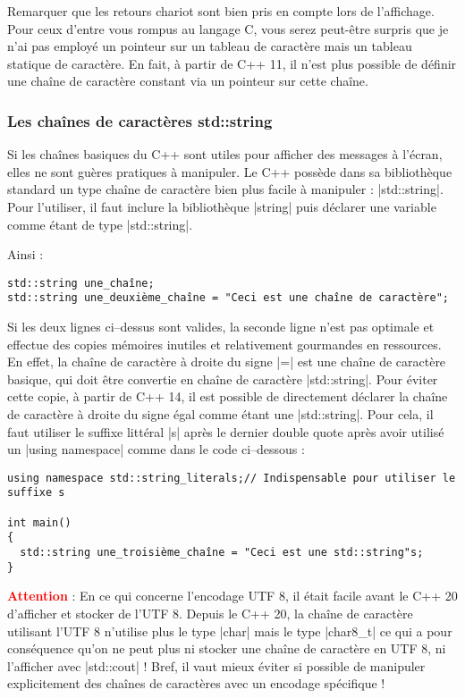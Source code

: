 Remarquer que les retours chariot sont bien pris en compte lors de l'affichage. Pour ceux d'entre vous rompus au langage C, vous serez peut-être surpris que je n'ai pas employé un pointeur sur un tableau de caractère mais un tableau statique
de caractère. En fait, à partir de C++ 11, il n'est plus possible de définir une chaîne de caractère constant via un pointeur sur cette chaîne.

\subsubsection{Les chaînes de caractères std::string}

Si les chaînes basiques du C++ sont utiles pour afficher des messages à l'écran, elles ne sont guères pratiques à manipuler. Le C++ possède dans sa bibliothèque standard un type chaîne de caractère bien plus facile à manipuler : |std::string|. Pour l'utiliser, il faut inclure la bibliothèque |string| puis déclarer une variable comme étant de type |std::string|.

Ainsi :
\begin{lstlisting}[caption=Déclaration d'une std::string]
std::string une_chaîne;
std::string une_deuxième_chaîne = "Ceci est une chaîne de caractère";
\end{lstlisting}

Si les deux lignes ci--dessus sont valides, la seconde ligne n'est pas optimale et effectue des copies mémoires inutiles et relativement gourmandes en ressources. En effet, la chaîne de caractère à droite du signe |=| est une chaîne de caractère basique, qui doit être convertie en chaîne de caractère |std::string|. 
Pour éviter cette copie, à partir de C++ 14, il est possible
de directement déclarer la chaîne de caractère à droite du signe égal comme étant une |std::string|. Pour cela, il faut utiliser le suffixe littéral |s| après le dernier double quote après avoir utilisé un |using namespace| comme dans le code ci--dessous :
\begin{lstlisting}[caption=Utilisation d'un litéral pour définir un std::string]
using namespace std::string_literals;// Indispensable pour utiliser le suffixe s

int main()
{
  std::string une_troisième_chaîne = "Ceci est une std::string"s; 
}
\end{lstlisting}

\textcolor{red}{\bf Attention} :
En ce qui concerne l'encodage UTF 8, il était facile avant le C++ 20 d'afficher et stocker de l'UTF 8.
Depuis le C++ 20, la chaîne de caractère utilisant l'UTF 8 n'utilise plus le type |char| mais le type
|char8_t| ce qui a pour conséquence qu'on ne peut plus ni stocker une chaîne de caractère en UTF 8, ni l'afficher
avec |std::cout| ! Bref, il vaut mieux éviter si possible de manipuler explicitement des chaînes de caractères avec
un encodage spécifique !

